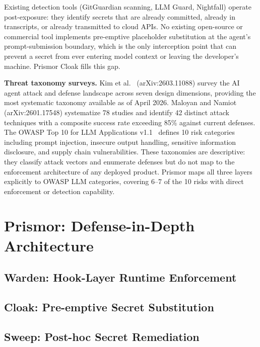 \documentclass[11pt,letterpaper]{article}
\begin{document}
Existing detection tools (GitGuardian scanning, LLM Guard, Nightfall) operate
post-exposure: they identify secrets that are already committed, already in
transcripts, or already transmitted to cloud APIs.
No existing open-source or commercial tool implements pre-emptive placeholder
substitution at the agent's prompt-submission boundary, which is the only
interception point that can prevent a secret from ever entering model context
or leaving the developer's machine.
Prismor Cloak fills this gap.

\textbf{Threat taxonomy surveys.}
Kim et al.~\cite{kim2026attack} (arXiv:2603.11088) survey the
AI agent attack and defense landscape across seven design dimensions, providing
the most systematic taxonomy available as of April 2026.
Maloyan and Namiot~\cite{maloyan2026prompt} (arXiv:2601.17548) systematize 78
studies and identify 42 distinct attack techniques with a composite success
rate exceeding 85\% against current defenses.
The OWASP Top 10 for LLM Applications v1.1~\cite{foundation2025owasp} defines 10 risk
categories including prompt injection, insecure output handling, sensitive
information disclosure, and supply chain vulnerabilities.
These taxonomies are descriptive: they classify attack vectors and enumerate
defenses but do not map to the enforcement architecture of any deployed product.
Prismor maps all three layers explicitly to OWASP LLM categories, covering 6--7
of the 10 risks with direct enforcement or detection capability.

\section{Prismor: Defense-in-Depth Architecture}

\subsection{Warden: Hook-Layer Runtime Enforcement}

\subsection{Cloak: Pre-emptive Secret Substitution}

\subsection{Sweep: Post-hoc Secret Remediation}
\end{document}

